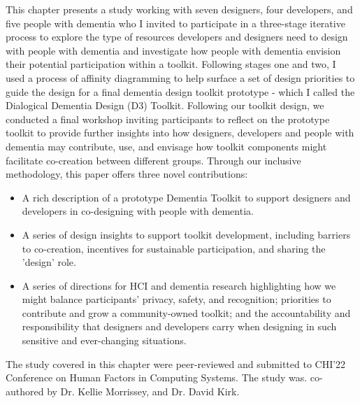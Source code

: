 This chapter presents a study working with seven designers, four developers, and five people with dementia who I invited to participate in a three-stage iterative process to explore the type of resources developers and designers need to design with people with dementia and investigate how people with dementia envision their potential participation within a toolkit. Following stages one and two, I used a process of affinity diagramming to help surface a set of design priorities to guide the design for a final dementia design toolkit prototype - which I called the Dialogical Dementia Design (D3) Toolkit. Following our toolkit design, we conducted a final workshop inviting participants to reflect on the prototype toolkit to provide further insights into how designers, developers and people with dementia may contribute, use, and envisage how toolkit components might facilitate co-creation between different groups. Through our inclusive methodology, this paper offers three novel contributions:
\begin{itemize}
    \item  A rich description of a prototype Dementia Toolkit to support designers and developers in co-designing with people with dementia.
    \item  A series of design insights to support toolkit development, including barriers to co-creation, incentives for sustainable participation, and sharing the 'design' role.
    \item A series of directions for HCI and dementia research highlighting how we might balance participants' privacy, safety, and recognition; priorities to contribute and grow a community-owned toolkit; and the accountability and responsibility that designers and developers carry when designing in such sensitive and ever-changing situations.
\end{itemize}

The study covered in this chapter were peer-reviewed and submitted to CHI'22 Conference on Human Factors in Computing Systems. The study was. co-authored by Dr. Kellie Morrissey, and Dr. David Kirk. 

